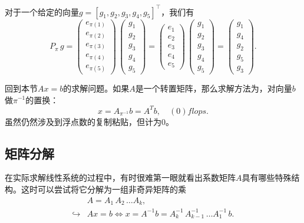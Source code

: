 \begin{subappendices}
对于一个给定的向量$g = \left[ g_{1}, g_{2}, g_{3}, g_{4}, g_{5} \right]^{\top}$，我们有
\begin{equation*}
  P_{\pi} \, g =
  \begin{pmatrix}
    e_{\pi(1)} \\
    e_{\pi(2)} \\
    e_{\pi(3)} \\
    e_{\pi(4)} \\
    e_{\pi(5)}
  \end{pmatrix}
  \,
  \begin{pmatrix}
    g_{1} \\
    g_{2} \\
    g_{3} \\
    g_{4} \\
    g_{5}
    \end{pmatrix}
    =
    \begin{pmatrix}
    e_{1} \\ e_{2} \\ e_{3} \\ e_{4} \\ e_{5}
    \end{pmatrix}
    \,
    \begin{pmatrix}
      g_{1} \\
      g_{2} \\
      g_{3} \\
      g_{4} \\
      g_{5}
      \end{pmatrix}
    = \begin{pmatrix}
    g_{1} \\ g_{4} \\ g_{2} \\ g_{5} \\ g_{3}
    \end{pmatrix}.
\end{equation*}

回到本节$Ax=b$的求解问题。如果$A$是一个转置矩阵，那么求解方法为，对向量$b$做$\pi^{-1}$的置换：
\begin{equation*}
  x = A_{\pi^{-1}} b = A^{T} b, \quad \left( 0 \right) flops.
\end{equation*}
虽然仍然涉及到浮点数的复制粘贴，但计为$0$。

\subsection{矩阵分解}
\label{sec:numlin-matrix-factorization}
在实际求解线性系统的过程中，有时很难第一眼就看出系数矩阵$A$具有哪些特殊结构。这时可以尝试将它分解为一组非奇异矩阵的乘
\begin{equation}
  \label{eq:numlin-matrix-factorization-fact-step}
\begin{split}
    & A = A_{1} \, A_{2} \, \ldots A_{k}, \\
    \hookrightarrow & A x = b \Leftrightarrow x = A^{-1} b
    = A_{k}^{-1} \, A_{k-1}^{-1} \, \ldots A_{1}^{-1} \, b.
\end{split}
\end{equation}


\end{subappendices}
